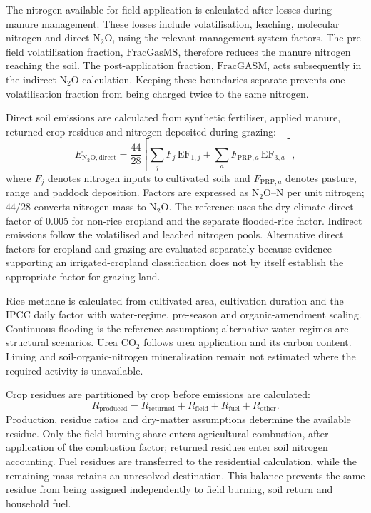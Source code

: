 \documentclass[essd]{copernicus}
\begin{document}
The nitrogen available for field application is calculated after losses during manure management. These losses include volatilisation, leaching, molecular nitrogen and direct N$_2$O, using the relevant management-system factors. The pre-field volatilisation fraction, $\mathrm{FracGasMS}$, therefore reduces the manure nitrogen reaching the soil. The post-application fraction, $\mathrm{FracGASM}$, acts subsequently in the indirect N$_2$O calculation. Keeping these boundaries separate prevents one volatilisation fraction from being charged twice to the same nitrogen.

Direct soil emissions are calculated from synthetic fertiliser, applied manure, returned crop residues and nitrogen deposited during grazing:
\begin{equation}
 E_{\mathrm{N_2O,direct}}
 =\frac{44}{28}\left[
 \sum_j F_j\,\mathrm{EF}_{1,j}
 +\sum_a F_{\mathrm{PRP},a}\,\mathrm{EF}_{3,a}
 \right],
 \label{eq:managed_soil_nitrogen}
\end{equation}
where $F_j$ denotes nitrogen inputs to cultivated soils and $F_{\mathrm{PRP},a}$ denotes pasture, range and paddock deposition. Factors are expressed as N$_2$O--N per unit nitrogen; $44/28$ converts nitrogen mass to N$_2$O. The reference uses the dry-climate direct factor of 0.005 for non-rice cropland and the separate flooded-rice factor. Indirect emissions follow the volatilised and leached nitrogen pools. Alternative direct factors for cropland and grazing are evaluated separately because evidence supporting an irrigated-cropland classification does not by itself establish the appropriate factor for grazing land.

Rice methane is calculated from cultivated area, cultivation duration and the IPCC daily factor with water-regime, pre-season and organic-amendment scaling. Continuous flooding is the reference assumption; alternative water regimes are structural scenarios. Urea CO$_2$ follows urea application and its carbon content. Liming and soil-organic-nitrogen mineralisation remain not estimated where the required activity is unavailable.

Crop residues are partitioned by crop before emissions are calculated:
\begin{equation}
 R_{\mathrm{produced}}=R_{\mathrm{returned}}+R_{\mathrm{field}}
 +R_{\mathrm{fuel}}+R_{\mathrm{other}}.
 \label{eq:residue_balance}
\end{equation}
Production, residue ratios and dry-matter assumptions determine the available residue. Only the field-burning share enters agricultural combustion, after application of the combustion factor; returned residues enter soil nitrogen accounting. Fuel residues are transferred to the residential calculation, while the remaining mass retains an unresolved destination. This balance prevents the same residue from being assigned independently to field burning, soil return and household fuel.
\end{document}
